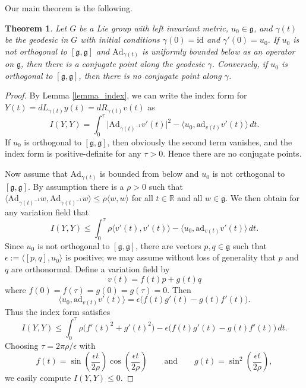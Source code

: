 \documentclass[oneside, 11pt]{amsart}
\newtheorem{theorem}{Theorem}[section]
\numberwithin{equation}{section}
\newcommand{\ad}{\mathrm{ad}}
\newcommand{\Ad}{\mathrm{Ad}}
\newcommand{\id}{\mathrm{id}}
\newcommand{\g}{\mathfrak{g}}
\begin{document}
Our main theorem is the following.

\begin{theorem}\label{generaltheorem}
Let $G$ be a Lie group with left invariant metric, $u_0\in\g$, and $\gamma(t)$ be the geodesic in $G$ with initial conditions $\gamma(0)=\id$ and $\gamma'(0)=u_0$. If $u_0$ is not orthogonal to $[\mathfrak{g},\mathfrak{g}]$ and $\Ad_{\gamma(t)}$ is uniformly bounded below as an operator on $\mathfrak{g}$, then there is a conjugate point along the geodesic $\gamma$. Conversely,  if $u_0$ is orthogonal to $[\mathfrak{g},\mathfrak{g}]$, then there is no conjugate point along $\gamma$. 
\end{theorem}

\begin{proof} 
    By Lemma \ref{lemma_index}, we can write the index form for $Y(t) = dL_{\gamma(t)} y(t) = dR_{\gamma(t)}v(t)$ as 
    $$ I(Y,Y) = \int_0^{\tau} \big\lvert  \Ad_{\gamma(t)^{-1}} v'(t)\big\rvert^2 - \langle u_0, \ad_{v(t)}v'(t)\rangle \, dt. $$
If $u_0$ is orthogonal to $[\mathfrak{g},\mathfrak{g}]$, then obviously the second term vanishes, and the index form is positive-definite for any $\tau>0$. Hence there are no conjugate points.

  
Now assume that $\Ad_{\gamma(t)}$ is bounded from below and $u_0$ is not orthogonal to $[\mathfrak{g},\mathfrak{g}]$. 
By assumption there is a $\rho>0$ such that $\langle \Ad_{\gamma(t)^{-1}}w,\Ad_{\gamma(t)^{-1}}w\rangle \le \rho \langle w,w\rangle$ for all $t\in\mathbb{R}$ and all $w\in\mathfrak{g}$. 
We then obtain for any variation field that
        $$ I(Y,Y) \le  \int_0^{\tau} \rho \langle v'(t), v'(t)\rangle - \langle u_0, \ad_{v(t)}v'(t)\rangle \, dt. $$
    Since $u_0$ is not orthogonal to $[\mathfrak{g},\mathfrak{g}]$, there are vectors $p,q\in\mathfrak{g}$ such that $\epsilon := \langle [p,q], u_0\rangle$ is positive; we may assume without loss of generality that $p$ and $q$ are orthonormal. Define a variation field by 
    $$ v(t) = f(t) p + g(t)q $$
    where $f(0)=f(\tau)=g(0)=g(\tau)=0$. Then $$\langle u_0,\ad_{v(t)}v'(t)\rangle 
    = \epsilon \big(f(t)g'(t)-g(t)f'(t)\big).$$ 
    Thus the index form satisfies 
    $$ I(Y,Y) \le \int_0^{\tau} \rho \big(f'(t)^2 + g'(t)^2\big) - \epsilon \big( f(t)g'(t)-g(t)f'(t)\big) \, dt.$$
    Choosing $\tau = 2\pi\rho/\epsilon$ with 
    $$ f(t) = 
     \sin{\left( \frac{\epsilon t}{2\rho}\right)}\cos{\left( \frac{\epsilon t}{2\rho}\right)}
      \qquad \text{and}\qquad 
    g(t) = \sin^2{\left( \frac{\epsilon t}{2\rho}\right)}, $$
    we easily compute $I(Y,Y)\le 0$. 
\end{proof}
\end{document}
